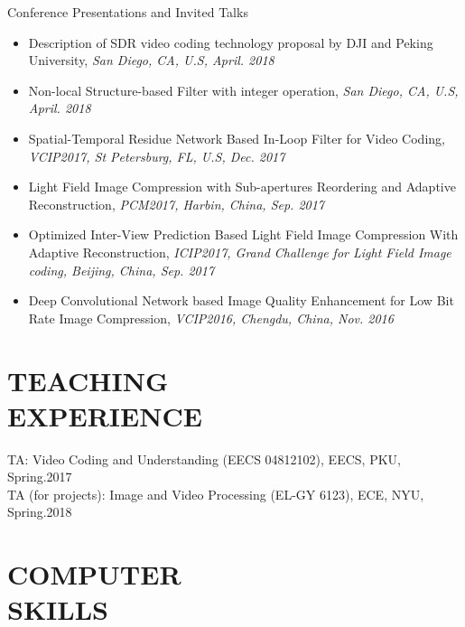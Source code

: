 \documentclass[margin, 10pt]{res} %
\begin{document}
\begin{resume}
Conference Presentations and Invited Talks
\begin{itemize} \itemsep -2pt
\item{Description of SDR video coding technology proposal by DJI and Peking University, {\em San Diego, CA, U.S, April. 2018}}
\item{Non-local Structure-based Filter with integer operation, {\em San Diego, CA, U.S, April. 2018}}
\item{Spatial-Temporal Residue Network Based In-Loop Filter for Video Coding, {\em VCIP2017, St Petersburg, FL, U.S, Dec. 2017}}
\item{Light Field Image Compression with Sub-apertures Reordering and Adaptive Reconstruction, {\em PCM2017, Harbin, China, Sep. 2017}}
\item{Optimized Inter-View Prediction Based Light Field Image Compression With Adaptive Reconstruction, {\em ICIP2017, Grand Challenge for Light Field Image coding, Beijing, China, Sep. 2017}}
\item{Deep Convolutional Network based Image Quality Enhancement for Low Bit Rate Image Compression, {\em VCIP2016, Chengdu, China, Nov. 2016}}
\end{itemize}


\section{TEACHING \\ EXPERIENCE}

TA: Video Coding and Understanding (EECS 04812102), EECS, PKU, \hfill Spring.2017 \\
TA (for projects): Image and Video Processing (EL-GY 6123), ECE, NYU, \hfill Spring.2018 \\



\section{COMPUTER \\ SKILLS}


\end{resume}
\end{document}
